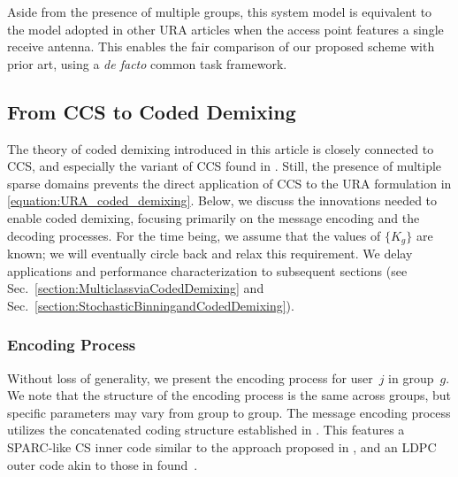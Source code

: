 \documentclass[journal]{IEEEtran}
\begin{document}
Aside from the presence of multiple groups, this system model is equivalent to the model adopted in other URA articles when the access point features a single receive antenna.
This enables the fair comparison of our proposed scheme with prior art, using a \emph{de facto} common task framework.


\subsection{From CCS to Coded Demixing}
\label{section:CCS approach}

The theory of coded demixing introduced in this article is closely connected to CCS, and especially the variant of CCS found in \cite{amalladinne2020unsourced}.
Still, the presence of multiple sparse domains prevents the direct application of CCS to the URA formulation in \eqref{equation:URA_coded_demixing}.
Below, we discuss the innovations needed to enable coded demixing, focusing primarily on the message encoding and the decoding processes.
For the time being, we assume that the values of $\{ K_g \}$ are known; we will eventually circle back and relax this requirement.
We delay applications and performance characterization to subsequent sections (see Sec.~\ref{section:MulticlassviaCodedDemixing} and Sec.~\ref{section:StochasticBinningandCodedDemixing}).


\subsubsection{Encoding Process}

Without loss of generality, we present the encoding process for user~$j$ in group~$g$.  
We note that the structure of the encoding process is the same across groups, but specific parameters may vary from group to group. 
The message encoding process utilizes the concatenated coding structure established in \cite{amalladinne2019coded}.
This features a SPARC-like CS inner code similar to the approach proposed in \cite{fengler2019sparcs}, and an LDPC outer code akin to those in found~\cite{amalladinne2020unsourced}.
\end{document}
